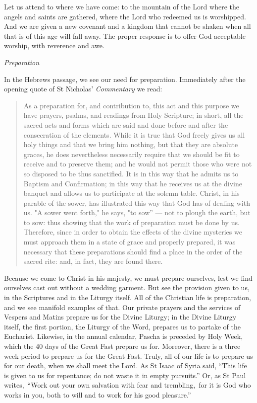 \documentclass[
]{article}
\begin{document}
Let us attend to where we have come: to the mountain of the Lord where
the angels and saints are gathered, where the Lord who redeemed us is
worshipped. And we are given a new covenant and a kingdom that cannot be
shaken when all that is of this age will fall away. The proper response
is to offer God acceptable worship, with reverence and awe.

\emph{Preparation}

In the Hebrews passage, we see our need for preparation. Immediately
after the opening quote of St Nicholas' \emph{Commentary} we read:

\begin{quote}
As a preparation for, and contribution to, this act and this purpose we
have prayers, psalms, and readings from Holy Scripture; in short, all
the sacred acts and forms which are said and done before and after the
consecration of the elements. While it is true that God freely gives us
all holy things and that we bring him nothing, but that they are
absolute graces, he does nevertheless necessarily require that we should
be fit to receive and to preserve them; and he would not permit those
who were not so disposed to be thus sanctified. It is in this way that
he admits us to Baptism and Confirmation; in this way that he receives
us at the divine banquet and allows us to participate at the solemn
table. Christ, in his parable of the sower, has illustrated this way
that God has of dealing with us. "A sower went forth," he says, "to
sow'' --- not to plough the earth, but to sow: thus showing that the
work of preparation must be done by us. Therefore, since in order to
obtain the effects of the divine mysteries we must approach them in a
state of grace and properly prepared, it was necessary that these
preparations should find a place in the order of the sacred rite: and,
in fact, they are found there.
\end{quote}

Because we come to Christ in his majesty, we must prepare ourselves,
lest we find ourselves cast out without a wedding garment. But see the
provision given to us, in the Scriptures and in the Liturgy itself. All
of the Christian life is preparation, and we see manifold examples of
that. Our private prayers and the services of Vespers and Matins prepare
us for the Divine Liturgy; in the Divine Liturgy itself, the first
portion, the Liturgy of the Word, prepares us to partake of the
Eucharist. Likewise, in the annual calendar, Pascha is preceded by Holy
Week, which the 40 days of the Great Fast prepare us for. Moreover,
there is a three week period to prepare us for the Great Fast. Truly,
all of our life is to prepare us for our death, when we shall meet the
Lord. As St Isaac of Syria said, ``This life is given to us for
repentance; do not waste it in empty pursuits.'' Or, as St Paul
writes,~``Work out your own salvation with fear and trembling,~for it is
God who works in you, both to will and to work for his good pleasure.''
\end{document}
